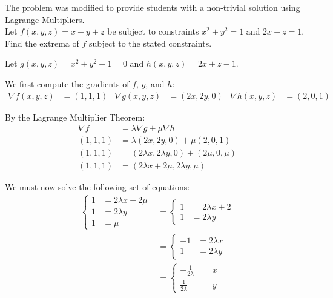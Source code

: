 \begin{tcolorbox}[
        title={Problem 6 (Modified)},
        valign=center,
        nobeforeafter,
        colframe=gray!95!black
    ]
    
The problem was modified to provide students with a non-trivial solution using Lagrange Multipliers. \\

Let \(f(x, y, z) = x + y + z\) be subject to constraints \(x^2 + y^2 = 1\) and \(2x + z = 1\). \\

Find the extrema of \(f\) subject to the stated constraints.
\end{tcolorbox}

\begin{solution}
    Let \(g(x, y, z) = x^2 + y^2 - 1 = 0\) and \(h(x, y, z) = 2x + z - 1\). 
    
    We first compute the gradients of \(f\), \(g\), and \(h\):
    \begin{align}
        \nabla f(x, y, z) &= (1, 1, 1) & \nabla g(x, y, z) &= (2x, 2y, 0) & \nabla h(x, y, z) &= (2, 0, 1) 
    \end{align}
    
    By the Lagrange Multiplier Theorem:
    \begin{align}
        \nabla f &= \lambda \nabla g + \mu \nabla h \\
        (1, 1, 1) &= \lambda (2x, 2y, 0) + \mu (2, 0, 1) \\
        (1, 1, 1) &= (2\lambda x, 2\lambda y, 0) + (2\mu, 0, \mu) \\
        (1, 1, 1) &= (2\lambda x + 2\mu, 2\lambda y, \mu)
    \end{align}
    
    We must now solve the following set of equations:
    \begin{align}
        \begin{cases}
            1 &= 2\lambda x + 2\mu \\
            1 &= 2\lambda y \\
            1 &= \mu
        \end{cases}
        &=
        \begin{cases}
            1 &= 2\lambda x + 2 \\
            1 &= 2\lambda y
        \end{cases} \\
        &=
        \begin{cases}
            -1 &= 2\lambda x \\
            1 &= 2\lambda y
        \end{cases} \\
        &=
        \begin{cases}
            -\frac{1}{2\lambda} &= x \\
            \frac{1}{2\lambda} &= y
        \end{cases}
    \end{align}
    

\end{solution}
